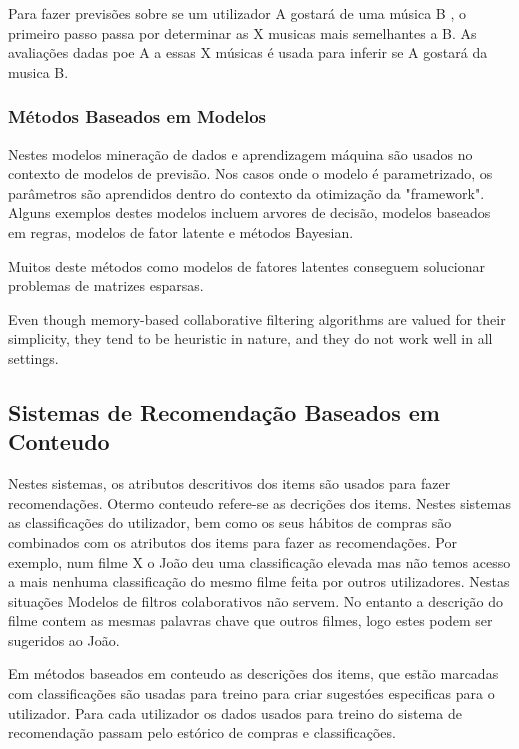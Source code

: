 Para fazer previsões sobre se um utilizador A gostará de uma música B , o primeiro passo passa por determinar as X musicas mais semelhantes a B. As avaliações dadas poe A a essas X músicas é usada para inferir se A gostará da musica B.



\subsubsection{Métodos Baseados em Modelos}

Nestes modelos mineração de dados e aprendizagem máquina são usados no contexto de modelos de previsão.
Nos casos onde o modelo é parametrizado, os parâmetros são aprendidos dentro do contexto da otimização da "framework".
Alguns exemplos destes modelos incluem arvores de decisão, modelos baseados em regras, modelos de fator latente e métodos Bayesian.

Muitos deste métodos como modelos de fatores latentes conseguem solucionar problemas de matrizes esparsas.
 
Even though memory-based collaborative filtering algorithms are valued for their simplicity, they tend to be heuristic in nature, and they do not work well in all settings.



\subsection{Sistemas de Recomendação Baseados em Conteudo}

Nestes sistemas, os atributos descritivos dos items são usados para fazer recomendações.
Otermo conteudo refere-se as decrições dos items. Nestes sistemas as classificações do utilizador, bem como os seus hábitos de compras são combinados com os atributos dos items para fazer as recomendações. 
Por exemplo, num filme X o João deu uma classificação elevada mas não temos acesso a mais nenhuma classificação do mesmo filme feita por outros utilizadores. Nestas situações Modelos de filtros colaborativos não servem. No entanto a descrição do filme contem as mesmas palavras chave que outros filmes, logo estes podem ser sugeridos ao João.

Em métodos baseados em conteudo as descrições dos items, que estão marcadas com classificações são usadas para treino para criar sugestóes especificas para o utilizador. Para cada utilizador os dados usados para treino do sistema de recomendação passam pelo estórico de compras e classificações.


